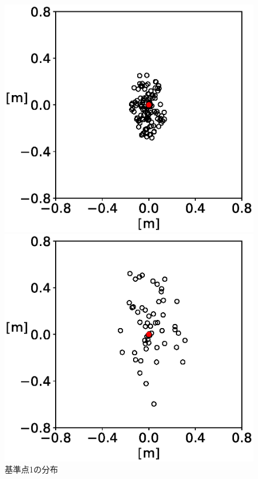 \documentclass[a4j, fleqn, 12pt]{jsreport}
\begin{document}
            \begin{figure}[ht]
                \begin{minipage}{0.32\hsize}
                    \centering
                    \includegraphics[width=1\hsize]{images/dist1.eps}
                    \caption{基準点1の分布}
                    \label{fig:distribution1}
                \end{minipage}
                \begin{minipage}{0.32\hsize}
                    \centering
                    \includegraphics[width=1\hsize]{images/dist2.eps}

\end{minipage}
\end{figure}
\end{document}
